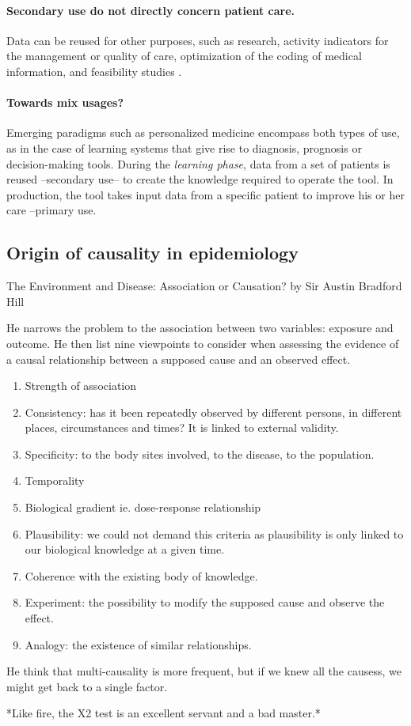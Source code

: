 \paragraph{Secondary use do not directly concern patient care.} Data can be
reused for other purposes, such as research, activity indicators for the
management or quality of care, optimization of the coding of medical
information, and feasibility studies
\citep{safran_toward_2007,cnil_referentiel_2021}.

\paragraph{Towards mix usages?}
Emerging paradigms such as personalized medicine encompass both types of use,
as in the case of learning systems that give rise to diagnosis, prognosis or
decision-making tools. During the \textit{learning phase}, data from a set of
patients is reused --secondary use-- to create the knowledge required to
operate the tool. In production, the tool takes input data from a specific
patient to improve his or her care --primary use.


\subsection{Origin of causality in epidemiology}%

The Environment and Disease: Association or Causation? by Sir Austin Bradford Hill

He narrows the problem to the association between two variables: exposure and
outcome. He then list nine viewpoints to consider when assessing the evidence of
a causal relationship between a supposed cause and an observed effect.

\begin{enumerate}
    \item Strength of association
    \item Consistency: has it been repeatedly observed by different persons, in
          different places, circumstances and times? It is linked to external
          validity.
    \item Specificity: to the body sites involved, to the disease, to the
          population.
    \item Temporality
    \item Biological gradient ie. dose-response relationship
    \item Plausibility: we could not demand this criteria as plausibility is only
          linked to our biological knowledge at a given time.
    \item Coherence with the existing body of knowledge.
    \item Experiment: the possibility to modify the supposed cause and observe
          the effect.
    \item Analogy: the existence of similar relationships.
\end{enumerate}


He think that multi-causality is more frequent, but if we knew all the causess,
we might get back to a single factor.

*Like fire, the X2 test is an excellent servant and a bad master.*